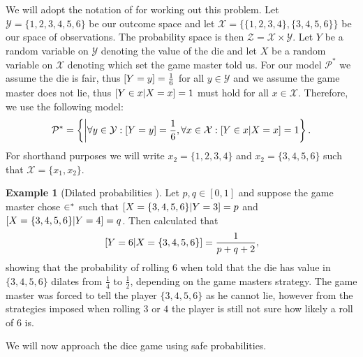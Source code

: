 \documentclass[twoside,a4paper]{article}
\theoremstyle{plain}
\theoremstyle{definition}
\newtheorem{example}[theorem]{Example}
\theoremstyle{remark}
\numberwithin{equation}{section}
\let\P\relax
\DeclareMathOperator{\P}{\mathbb{P}}
\DeclareMathOperator{\1}{\mathbbm{1}}
\newcommand{\X}{\mathcal{X}}
\newcommand{\Y}{\mathcal{Y}}
\newcommand{\Pmod}{\mathcal{P}^*}
\begin{document}
We will adopt the notation of \cite{Grunwald13} for working out this problem. Let $\Y=\{1,2,3,4,5,6\}$ be our outcome space and let $\X=\{\{1,2,3,4\},\{3,4,5,6\}\}$ be our space of observations. The probability space is then $\mathcal{Z}=\X\times\Y$. Let $Y$ be a random variable on $\Y$ denoting the value of the die and let $X$ be a random variable on $\X$ denoting which set the game master told us. For our model $\Pmod$ we assume the die is fair, thus $\P[Y=y]=\frac{1}{6}$ for all $y\in\Y$ and we assume the game master does not lie, thus $\P[Y\in x|X=x]=1$ must hold for all $x\in\X$. Therefore, we use the following model:
\[\Pmod=\left\{\P\middle|\forall y\in\Y:\P[Y=y]=\frac{1}{6},\forall x\in\X:\P[Y\in x|X=x]=1\right\}.\]
For shorthand purposes we will write $x_2=\{1,2,3,4\}$ and $x_2=\{3,4,5,6\}$ such that $\X=\{x_1,x_2\}$.

\begin{example}[Dilated probabilities \cite{Grunwald13}]
Let $p,q\in[0,1]$ and suppose the game master chose $\P\in\P^*$ such that $\P[X=\{3,4,5,6\}|Y=3]=p$ and $\P[X=\{3,4,5,6\}|Y=4]=q$. Then \cite{Grunwald13} calculated that 
\[\P[Y=6|X=\{3,4,5,6\}]=\frac{1}{p+q+2},\]
showing that the probability of rolling $6$ when told that the die has value in $\{3,4,5,6\}$ dilates from $\frac{1}{4}$ to $\frac{1}{2}$, depending on the game masters strategy. The game master was forced to tell the player $\{3,4,5,6\}$ as he cannot lie, however from the strategies imposed when rolling $3$ or $4$ the player is still not sure how likely a roll of $6$ is.
\end{example}

We will now approach the dice game using safe probabilities.
\end{document}
